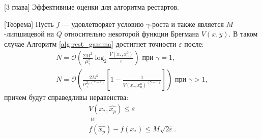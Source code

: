 \begin{frame} {[3 глава] Эффективные оценки для алгоритма рестартов.}
\begin{block}{[Теорема]} \label{simple_restart}
    Пусть $f$ --- удовлетворяет условию $\gamma$-роста и также является $M$-липшицевой на $Q$ относительно некоторой функции Брегмана $V(x, y)$. В таком случае Алгоритм \ref{alg:rest_gamma} достигнет точности $\varepsilon$ после:
    \begin{equation}
    \begin{aligned}
       N = \mathcal{O} \left(\frac{2 M^2}{\mu_{\gamma}^2} \log_2{\frac{V(x_*, x_0^0)}{\varepsilon}} \right) \text{ при } \gamma = 1, \\
       N = \mathcal{O} \left( \frac{2 M^2}{\mu_{\gamma}^2 \varepsilon^{(\gamma-1)} } \left[1 - \frac{1} {V(x_*, x_0^0)^{(\gamma - 1)}}\right] \right) \text{ при } \gamma > 1,
    \end{aligned}
    \end{equation}
    причем будут справедливы неравенства:
    \begin{equation}
    \begin{aligned}
       V(x_*, \widehat{x_p}) \leq \varepsilon\\
       \text{ и }\\
       f(\widehat{x_p}) - f(x_*) \leq M \sqrt{2 \varepsilon}.
    \end{aligned}
    \end{equation}
\end{block}
\end{frame}

